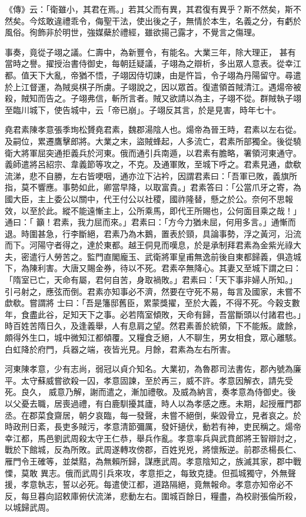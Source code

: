 \begin{pinyinscope}
 《傳》云：「衛雖小，其君在焉。」若其父而有異，其君復有異乎？斯不然矣，斯不然矣。今炫敢違禮乖令，侮聖干法，使出後之子，無情於本生，名義之分，有虧於風俗。徇飾非於明世，強媒蘗於禮經，雖欲揚己露才，不覺言之傷理。



 事奏，竟從子翊之議。仁壽中，為新豐令，有能名。大業三年，除大理正，
 甚有當時之譽。擢授治書侍御史，每朝廷疑議，子翊為之辯析，多出眾人意表。從幸江都。值天下大亂，帝猶不悟，子翊因侍切諫，由是忤旨，令子翊為丹陽留守。尋遣於上江督運，為賊吳棋子所虜。子翊說之，因以眾首。復遣領首賊清江。遇煬帝被殺，賊知而告之。子翊弗信，斬所言者。賊又欲請以為主，子翊不從。群賊執子翊至臨川城下，使告城中，云「帝已崩」。子翊反其言，於是見害，時年七十。



 堯君素陳孝意張季珣松贇堯君素，魏郡湯陰人也。煬帝為晉王時，君素以左右從。
 及嗣位，累遷鷹擊郎將。大業之末，盜賊蜂起，人多流亡，君素所部獨全。後從驍衛大將軍屈突通拒義兵於河東。俄而通引兵南遁，以君素有膽略，署領河東通守。義師遣將呂紹宗、韋義節等攻之，不克。及通軍敗，至城下呼之。君素見通，歔欷流涕，悲不自勝，左右皆哽咽，通亦泣下沾衿，因謂君素曰：「吾軍已敗，義旗所指，莫不響應。事勢如此，卿當早降，以取富貴。」君素答曰：「公當爪牙之寄，為國大臣，主上委公以關中，代王付公以社稷，國祚隆替，懸之於公。奈何不思報效，以至於此。縱不能遠慚主上，公所乘馬，即代王所賜也，公何面目乘之哉！」通曰：「
 籲！君素，我力屈而來。」君素曰：「方今力猶未屈，何用多言。」通慚而退。時圍甚急，行李斷絕，君素乃為木鵝，置表於頸，具論事勢，浮之黃河，沿流而下。河陽守者得之，達於東都。越王侗見而嘆息，於是承制拜君素為金紫光祿大夫，密遣行人勞苦之。監門直閣龐玉、武衛將軍皇甫無逸前後自東都歸義，俱造城下，為陳利害。大唐又賜金券，待以不死。君素卒無降心。其妻又至城下謂之曰：「隋室已亡，天命有屬，君何自苦，身取禍敗。」君素曰：「天下事非婦人所知。」引弓射之，應弦而倒。君素亦知事必不濟，然要在守死不易，每言及國家，未嘗不歔欷。嘗謂將
 士曰：「吾是籓邸舊臣，累蒙獎擢，至於大義，不得不死。今穀支數年，食盡此谷，足知天下之事。必若隋室傾敗，天命有歸，吾當斷頭以付諸君也。」時百姓苦隋日久，及逢義舉，人有息肩之望。然君素善於統領，下不能叛。歲餘，頗得外生口，城中微知江都傾覆。又糧食乏絕，人不聊生，男女相食，眾心離駭。白虹降於府門，兵器之端，夜皆光見。月餘，君素為左右所害。



 河東陳孝意，少有志尚，弱冠以貞介知名。大業初，為魯郡司法書佐，郡內號為廉平。太守蘇威嘗欲殺一囚，孝意固諫，至於再三，威不許。孝意因解衣，請先受死。良久，
 威意乃解，謝而遣之，漸加禮敬。及威為納言，奏孝意為侍御史。後以父憂去職，居喪過禮，有白鹿馴擾其廬，時人以為孝感之應。未期，起授雁門郡丞。在郡菜食齋居，朝夕哀臨，每一發聲，未嘗不絕倒，柴毀骨立，見者哀之。於時政刑日紊，長吏多賊污，孝意清節彌厲，發奸擿伏，動若有神，吏民稱之。煬帝幸江都，馬邑劉武周殺太守王仁恭，舉兵作亂。孝意率兵與武賁郎將王智辯討之，戰於下館城，反為所敗。武周遂轉攻傍郡，百姓兇兇，將懷叛逆。前郡丞楊長仁、雁門令王確等，並桀黠，為無賴所歸，謀應武周。孝意陰知之，族滅其家，郡中戰慄，莫敢
 異志。俄而武周引兵來攻，孝意拒之，每致克捷。但孤城獨守，外無聲援，孝意執志，誓以必死。每遣使江都，道路隔絕，竟無報命。孝意亦知帝必不反，每旦暮向詔敕庫俯伏流涕，悲動左右。圍城百餘日，糧盡，為校尉張倫所殺，以城歸武周。




\end{pinyinscope}

